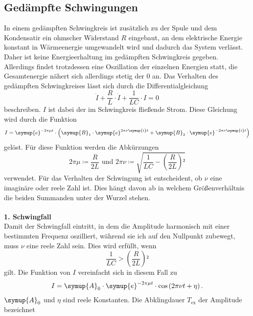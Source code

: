 \subsection{Gedämpfte Schwingungen}
In einem gedämpften Schwingkreis ist zusätzlich zu der Spule und dem Kondensatir ein ohmscher Widerstand $R$ eingebaut, an dem elektrische Energie konstant in 
Wärmeenergie umgewandelt wird und dadurch das System verlässt. Daher ist keine Energieerhaltung im gedämpften Schwingkreis gegeben. Allerdings findet trotzdessen eine 
Oszillation der einzelnen Energien statt, die Gesamtenergie nähert sich allerdings stetig der $0$ an. 
Das Verhalten des gedämpften Schwingkreises lässt sich durch die Differentialgleichung 
\begin{equation}
    \ddot{I} + \frac{R}{L} \cdot \dot{I} + \frac{1}{L C} \cdot I = 0 
\end{equation}
beschreiben. $I$ ist dabei der im Schwingkreis fließende Strom. 
Diese Gleichung wird durch die Funktion  
\begin{equation}
    I = \symup{e}^{-2\pi\mu t} \cdot \left(\symup{B}_1 \cdot \symup{e}^{2\pi\nu \symup{i}t}  + \symup{B}_2 \cdot \symup{e}^{- 2\pi\nu \symup{i}t} \right)
\end{equation}
gelöst. Für diese Funktion werden die Abkürzungen 
\begin{equation*}
2 \pi \mu \coloneqq \frac{R}{2 L}  \,\,\text{und}\,\, 2 \pi \nu \coloneqq \sqrt{\frac{1}{LC} - \left(\frac{R}{2L}\right)²}
\end{equation*}
verwendet. Für das Verhalten der Schwingung ist entscheident, ob $\nu$ eine imaginäre
oder reele Zahl ist. Dies hängt davon ab in welchem Größenverhältnis die beiden 
Summanden unter der Wurzel stehen. \\
\\
\textbf{1. Schwingfall}\\
Damit der Schwingfall eintritt, in dem die Amplitude harmonisch mit einer bestimmten Frequenz 
oszilliert, während sie ich auf den 
Nullpunkt zubewegt, muss $\nu$ eine reele Zahl sein. Dies wird erfüllt, wenn 
\begin{equation*}
    \frac{1}{LC} > \left(\frac{R}{2L}\right)² 
\end{equation*}
gilt. Die Funktion von $I$ vereinfacht sich in diesem Fall zu
\begin{equation}
    I = \symup{A}_0 \cdot \symup{e}^{-2\pi\mu t} \cdot \cos{ \left(2\pi\nu t + \eta\right)} \, .
\end{equation}
$\symup{A}_0$ und $\eta$ sind reele Konstanten. Die Abklingdauer $T_{\text{ex}}$ der Amplitude bezeichnet
